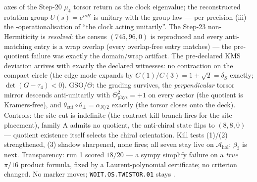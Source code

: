 \documentclass[11pt,a4paper]{article}
\theoremstyle{definition}
\begin{document}
axes of the Step-20 $\mu_4$ torsor return as the clock eigenvalue; the reconstructed rotation
group $U(s) = e^{isH}$ is unitary with the group law --- per precision (iii) the
\mC-operationalisation of ``the clock acting unitarily''. The Step-23 non-Hermiticity is
\emph{resolved}: the census $(745, 96, 0)$ is reproduced and every anti-matching entry is a
wrap overlap (every overlap-free entry matches) --- the pre-quotient failure was exactly the
domain/wrap artifact. The pre-declared KMS deviation arrives with exactly the declared
witnesses: no contraction on the compact circle (the edge mode expands by $C(1)/C(3) = 1 +
\sqrt2 = \delta_S$ exactly; $\det(G - \tau_4) < 0$). GSO/$\Theta$: the grading survives, the
\emph{perpendicular} torsor mirror descends anti-unitarily with $\Theta_{\mathrm{phys}}^2 =
+1$ on every sector (the quotient is Kramers-free), and $\theta_{\mathrm{cut}}\circ
\theta_\perp = \alpha_{N/2}$ exactly (the torsor closes onto the deck). Controls: the site
cut is indefinite (the contract kill branch fires for the site placement), family A admits no
quotient, the anti-chiral state flips to $(8,8,0)$ --- quotient existence itself selects the
chiral orientation. Kill tests (1)/(2) strengthened, (3) shadow sharpened, none fires; all
seven stay live on $\mathcal A_{\mathrm{hol}}$; $\beta_3$ is next. Transparency: run 1 scored
$18/20$ --- a sympy simplify failure on a \emph{true} $\pi/16$ product formula, fixed by a
Laurent-polynomial certificate; no criterion changed. No marker moves;
\texttt{WOIT.OS.TWISTOR.01} stays \mO.
\end{document}
